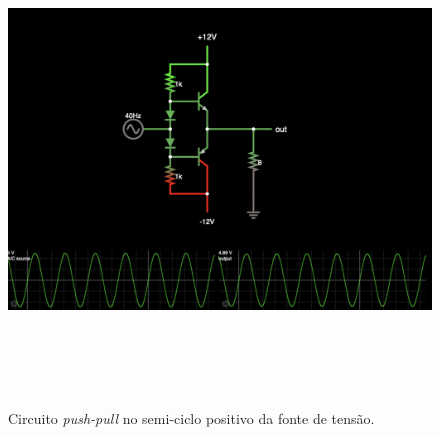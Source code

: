 \documentclass{article}
\begin{document}
    \begin{figure}[!h]
        \centering
        \includegraphics[width=13cm,height=13cm,keepaspectratio]{imagens/cicloPos.png}
        \caption{Circuito \emph{push-pull} no semi-ciclo positivo da fonte de tensão.}
        \label{fig:push-pull-pos}
    \end{figure}
\end{document}
